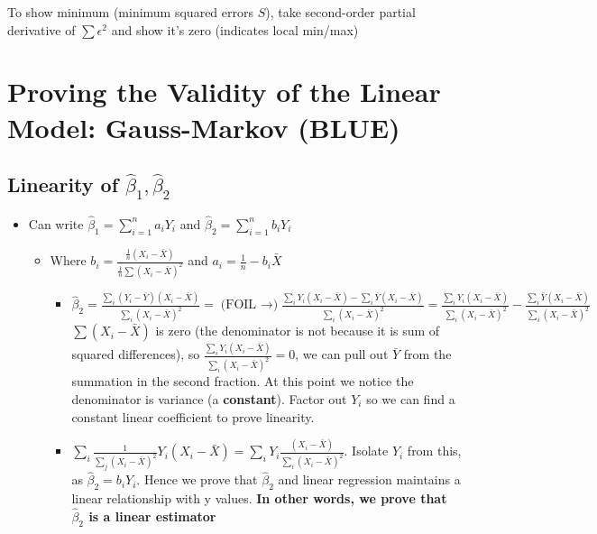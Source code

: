 \documentclass[10pt, oneside]{article}
\begin{document}
To show minimum (minimum squared errors $S$), take second-order partial derivative of $\sum \epsilon^2$ and show it's zero (indicates local min/max)

\section{Proving the Validity of the Linear Model: Gauss-Markov (BLUE)}

\subsection{Linearity of $\hat \beta_1, \hat \beta_2$}
\begin{itemize}
    \item Can write $\hat \beta_1=\sum_{i=1} ^n a_i Y_i$ and $\hat \beta_2 =\sum_{i=1} ^n b_iY_i$
    \begin{itemize}
        \item Where $b_i = \frac{\frac{1}{n} (X_i-\bar X)}{\frac{1}{n} \sum(X_i-\bar X)^2}$ and $a_i = \frac{1}{n} - b_i \bar X$
        \begin{itemize}
            \item $\hat \beta_2 = \frac{\sum_i (Y_i -\bar Y) (X_i -\bar X)}{\sum_i (X_i -\bar X)^2}=\text{(FOIL $\rightarrow$)} \frac{\sum_i Y_i (X_i -\bar X)-\sum_i \bar Y (X_i -\bar X)}{\sum_i (X_i -\bar X)^2}=\frac{\sum_i Y_i (X_i-\bar X)}{\sum _i (X_i - \bar X)^2} - \frac{\sum_i \bar Y (X_i-\bar X)}{\sum _i (X_i - \bar X)^2}$ \\
            $\sum(X_i -\bar X)$ is zero (the denominator is not because it is sum of squared differences), so $\frac{\sum_i Y_i (X_i-\bar X)}{\sum _i (X_i - \bar X)^2} = 0$, we can pull out $\bar Y$ from the summation in the second fraction. At this point we notice the denominator is variance (a \textbf{constant}). Factor out $Y_i$ so we can find a constant linear coefficient to prove linearity.
            \item $\sum_i \frac{1}{\sum_j (X_i - \bar X)^2} Y_i (X_i -\bar X) =\sum_i Y_i \frac{(X_i -\bar X)}{\sum_i (X_i -\bar X)^2}$. Isolate $Y_i$ from this, as $\hat \beta_2 = b_i Y_i$. Hence we prove that $\hat \beta_2$ and linear regression maintains a linear relationship with y values. \textbf{In other words, we prove that $\hat \beta_2$ is a linear estimator}
        \end{itemize}
    \end{itemize}
\end{itemize}
\end{document}
